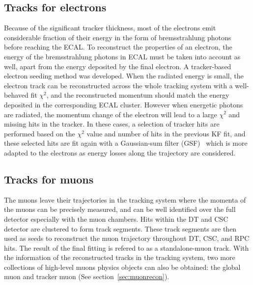 \subsection{Tracks for electrons}
Because of the significant tracker thickness, most of the electrons emit considerable fraction of their energy in the form of bremsstrahlung photons before reaching the ECAL. To reconstruct the properties of an electron, the energy of the bremsstrahlung photons in ECAL must be taken into account as well, apart from the energy deposited by the final electron. A tracker-based electron seeding method was developed. When the radiated energy is small, the electron track can be reconstructed across the whole tracking system with a well-behaved fit $\chi^2$, and the reconstructed momentum should match the energy deposited in the corresponding ECAL cluster. However when energetic photons are radiated, the momentum change of the electron will lead to a large $\chi^2$ and missing hits in the tracker. In these cases, a selection of tracker hits are performed based on the $\chi^2$ value and number of hits in the previous KF fit, and these selected hits are fit again with a Gaussian-sum filter (GSF)~\cite{ob_electronconst} which is more adapted to the electrons as energy losses along the trajectory are considered. 

\subsection{Tracks for muons}
The muons leave their trajectories in the tracking system where the momenta of the muons can be precisely measured, and can be well identified over the full detector especially with the muon chambers. Hits within the DT and CSC detector are clustered to form track segments. These track segments are then used as seeds to reconstruct the muon trajectory throughout DT, CSC, and RPC hits. The result of the final fitting is refered to as a standalone-muon track. With the information of the reconstructed tracks in the tracking system, two more collections of high-level muons physics objects can also be obtained: the global muon and tracker muon (See section~\ref{sec:muonrecon}).

